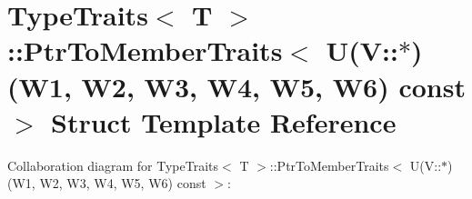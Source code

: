 \hypertarget{structTypeTraits_1_1PtrToMemberTraits_3_01U_07V_1_1_5_08_07W1_00_01W2_00_01W3_00_01W4_00_01W5_00_01W6_08_01const_01_01_4}{}\section{Type\+Traits$<$ T $>$\+:\+:Ptr\+To\+Member\+Traits$<$ U(V\+:\+:$\ast$)(W1, W2, W3, W4, W5, W6) const $>$ Struct Template Reference}
\label{structTypeTraits_1_1PtrToMemberTraits_3_01U_07V_1_1_5_08_07W1_00_01W2_00_01W3_00_01W4_00_01W5_00_01W6_08_01const_01_01_4}


Collaboration diagram for Type\+Traits$<$ T $>$\+:\+:Ptr\+To\+Member\+Traits$<$ U(V\+:\+:$\ast$)(W1, W2, W3, W4, W5, W6) const $>$\+:
